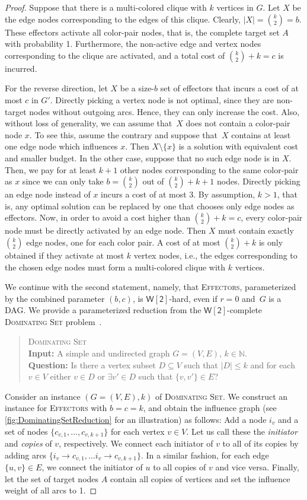 \documentclass{article}
\newcommand{\wtwo}{{\mathsf{W[2]}}}
\newcommand{\N}{{\mathbb{N}}}
\newcommand{\probDef}[3]{
  \begin{quote}
    #1 \\
    \textbf{Input:} #2 \\
    \textbf{Question:} #3
  \end{quote}
}
\newcommand{\probDominatingSet}{\textsc{Dominating Set}\xspace}
\newcommand{\probEffectors}{\textsc{Effectors}\xspace}
\begin{document}
\begin{proof}
  Suppose that there is a multi-colored clique with $k$ vertices in
  $G$. Let $X$ be the edge nodes corresponding to the edges of this
  clique.
  Clearly, $|X| = \binom{k}{2} = b$. These effectors activate all
  color-pair nodes, that is, the complete target set $A$ with
  probability 1.
  Furthermore, the non-active edge and vertex nodes corresponding to the
  clique are activated, and a total cost of $\binom{k}{2} + k = c$ is
  incurred.
   
  For the reverse direction, let $X$ be a size-$b$ set of effectors
  that incurs a cost of at most $c$ in $G'$. Directly picking a vertex
  node is not optimal, since they are non-target nodes without outgoing arcs.
  Hence, they can only increase the cost.
  Also, without loss of generality, we can assume that~$X$ does not contain a color-pair node $x$.
  To see this, assume the contrary and
  suppose that~$X$ contains at least one edge node which 
  influences $x$. Then $X \setminus \{x\}$ is a solution with equivalent cost
  and smaller budget. In the other case, suppose that no such edge node is in $X$.   
  Then, we pay for at least $k+1$ other nodes corresponding to the
  same color-pair as $x$ since we can only take $b = \binom{k}{2}$ out of
  $\binom{k}{2} + k + 1$ nodes. Directly picking an edge node instead of $x$ incurs a cost of at most 3.
  By assumption, $k > 1$, that is, any optimal solution
  can be replaced by one that chooses only edge nodes as effectors.
  Now, in order to avoid a cost higher than $\binom{k}{2}+k = c$, 
  every color-pair node must be directly activated by an edge node.
  Then $X$ must contain exactly $\binom{k}{2}$ edge nodes, one for each color pair. A cost of at most $\binom{k}{2}+k$ is only obtained if they activate at most $k$ vertex nodes, i.e., the edges corresponding to the chosen edge nodes must form
  a multi-colored clique with $k$ vertices.

  We continue with the second statement,
  namely, that \probEffectors, parameterized by the combined parameter $(b, c)$,
  is $\wtwo$-hard, even if $r = 0$ and~$G$ is a DAG.
  We provide a parameterized reduction from the $\wtwo$-complete
  \probDominatingSet problem~\cite{DF13}.
  \probDef
    {\probDominatingSet}
    {A simple and undirected graph $G = (V, E)$, $k \in \N$.}
    {Is there a vertex subset $D \subseteq V$ such that $|D| \leq k$ and for each $v \in V$ either $v \in D$ or $\exists v' \in D$ such that $\{v, v'\} \in E$?}
  Consider an instance $(G = (V, E), k)$ of \probDominatingSet. We construct an instance for \probEffectors with $b = c = k$, and obtain the influence graph (see \autoref{fig:DominatingSetReduction} for an illustration) as follows:
  Add a node $i_v$ and a set of nodes $\{ c_{v,1} , \ldots, c_{v, k+1} \}$ for each vertex $v \in V$. Let us call these the \emph{initiator} and \emph{copies} of $v$, respectively. We connect each initiator of $v$ to all of its copies by adding arcs $\{ i_v \rightarrow c_{v,1} ,\ldots i_v \rightarrow c_{v, k+1} \}$. In a similar fashion, for each edge $\{u, v\} \in E$, we connect the initiator of $u$ to all copies of $v$ and vice versa. Finally, let the set of target nodes $A$ contain all copies of vertices and set the influence weight of all arcs to 1.
  

\end{proof}
\end{document}
